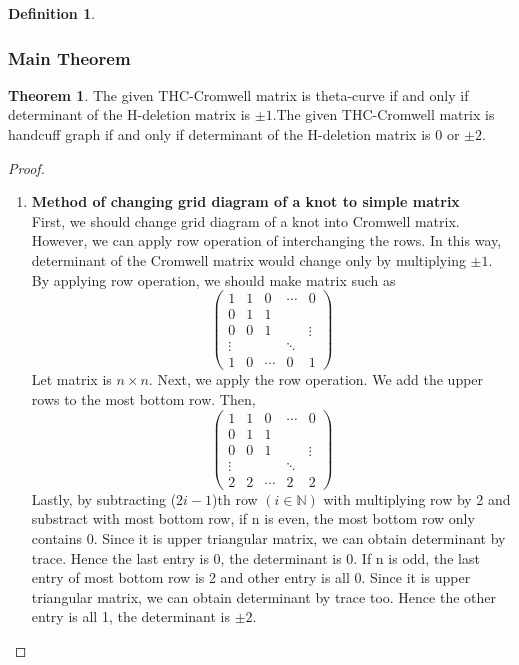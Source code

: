 \documentclass{article}
\theoremstyle{definition}
\newtheorem{defn}[thm]{Definition}
\theoremstyle{theorem}
\newtheorem{theorem}{Theorem}
\theoremstyle{proposition}
\theoremstyle{corollary}
\begin{document}
\begin{defn}
\subsubsection{Main Theorem}
\begin{theorem}The given THC-Cromwell matrix is theta-curve if and only if determinant of the H-deletion matrix is $\pm 1$.The given THC-Cromwell matrix is handcuff graph if and only if determinant of the H-deletion matrix is 0 or $\pm 2$.
\end{theorem}

\begin{proof}
\begin{enumerate}
    \item \textbf{Method of changing grid diagram of a knot to simple matrix}\\
    First, we should change grid diagram of a knot into Cromwell matrix. However, we can apply row operation of interchanging the rows. In this way, determinant of the Cromwell matrix would change only by multiplying $\pm 1$.\\
By applying row operation, we should make matrix such as
    $$\begin{pmatrix} 
    1 & 1 & 0 & \cdots & 0\\
    0 & 1 & 1 &  &  \\
    0 & 0 & 1 & & \vdots\\ 
    \vdots & & & \ddots & \\
    1 & 0 & \cdots & 0 & 1
    \end{pmatrix}$$
Let matrix is $n\times n$.
Next, we apply the row operation. We add the upper rows to the most bottom row. Then,
    $$\begin{pmatrix} 
    1 & 1 & 0 & \cdots & 0\\
    0 & 1 & 1 &  &  \\
    0 & 0 & 1 & & \vdots\\ 
    \vdots & & & \ddots & \\
    2 & 2 & \cdots & 2 & 2
    \end{pmatrix}$$
Lastly, by subtracting ($2i-1$)th row $(i \in \mathbb{N})$ with multiplying row by 2 and substract with most bottom row, if n is even, the most bottom row only contains 0. Since it is upper triangular matrix, we can obtain determinant by trace. Hence the last entry is 0, the determinant is 0. If n is odd, the last entry of most bottom row is 2 and other entry is all 0. Since it is upper triangular matrix, we can obtain determinant by trace too. Hence the other entry is all 1, the determinant is $\pm 2$.\\


\end{enumerate}
\end{proof}
\end{defn}
\end{document}
